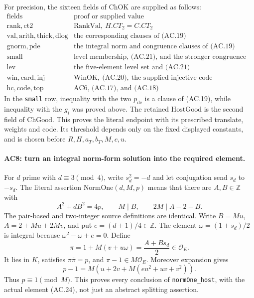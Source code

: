 \documentclass[11pt,a4paper]{article}
\numberwithin{equation}{section}
\theoremstyle{remark}\newtheorem{remark}[theorem]{Remark}
\begin{document}
For precision, the sixteen fields of $\mathrm{ChOK}$ are supplied as
follows:
\[
\begin{array}{c|l}
\text{fields}&\text{proof or supplied value}\\ \hline
\mathrm{rank},\mathrm{ct2}&\mathrm{RankVal},\ H.CT_2=C.CT_2\\
\mathrm{val},\mathrm{arith},\mathrm{thick},\mathrm{dlog}
      &\text{the corresponding clauses of (AC.19)}\\
\mathrm{gnorm},\mathrm{pde}&\text{the integral norm and congruence clauses of (AC.19)}\\
\mathrm{small}&\text{level membership, (AC.21), and the stronger congruence above}\\
\mathrm{lev}&\text{the five-element level set and (AC.21)}\\
\mathrm{win},\mathrm{card},\mathrm{inj}
      &\mathrm{WinOK},\ \text{(AC.20)},\ \text{the supplied injective code}\\
\mathrm{hc},\mathrm{code},\mathrm{top}&\text{AC6, (AC.17), and (AC.18)}
\end{array}                                                   \tag{AC.22}
\]
In the \texttt{small} row, inequality with the two $p_{\mathrm{de}}$
is a clause of (AC.19), while inequality with the $g_i$ was proved
above. The retained $\mathrm{HostGood}$ is the second field of
$\mathrm{ChGood}$. This proves the literal endpoint with its
prescribed translate, weights and code. Its threshold depends only
on the fixed displayed constants, and is chosen before $R,H,a_T,b_T,M,c,u$.

\paragraph{AC8: turn an integral norm-form solution into the required element.}
For $d$ prime with $d\equiv3\pmod4$, write $s_d^2=-d$ and let
conjugation send $s_d$ to $-s_d$. The literal assertion
$\mathrm{NormOne}(d,M,p)$ means that there are $A,B\in\mathbb Z$
with
\[
 A^2+dB^2=4p,\qquad M\mid B,\qquad 2M\mid A-2-B.
                                                               \tag{AC.23}
\]
The pair-based and two-integer source definitions are identical.
Write $B=M u$, $A=2+Mu+2Mv$, and put $e=(d+1)/4\in\mathbb Z$.
The element $\omega=(1+s_d)/2$ is integral because
$\omega^2-\omega+e=0$. Define
\[
       \pi=1+M(v+u\omega)=\frac{A+B s_d}{2}\in\mathcal O_E.
                                                               \tag{AC.24}
\]
It lies in $K$, satisfies $\pi\overline\pi=p$, and
$\pi-1\in M\mathcal O_E$. Moreover expansion gives
\[
     p-1=M\left(u+2v+M(eu^2+uv+v^2)\right).
                                                               \tag{AC.25}
\]
Thus $p\equiv1\pmod M$. This proves every conclusion of
\texttt{normOne\_\allowbreak host}, with the actual element (AC.24), not just
an abstract splitting assertion.
\end{document}
